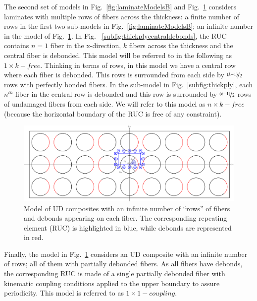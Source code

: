 \documentclass[review]{elsarticle}
\begin{document}
The second set of models in Fig.~\ref{fig:laminateModelsB} and Fig.~\ref{fig:thickplyalldebonds} considers laminates with multiple rows of fibers across the thickness: a finite number of rows in the first two sub-models in Fig.~\ref{fig:laminateModelsB}; an infinite number in the model of Fig.~\ref{fig:thickplyalldebonds}. In Fig. ~\ref{subfig:thickplycentraldebonds}, the RUC contains $n=1$ fiber in the x-direction, $k$ fibers across the thickness and the central fiber is debonded. This model will be referred to in the following as $1\times k-free$. Thinking in terms of rows, in this model we have a central row where each fiber is debonded. This rows is surrounded from each side by $\nicefrac{\left(k-1\right)}{2}$ rows with perfectly bonded fibers. In the sub-model in Fig.~\ref{subfig:thickply}, each $n^{th}$ fiber in the central row is debonded and this row is surrounded by $\nicefrac{\left(k-1\right)}{2}$ rows of undamaged fibers from each side. We will refer to this model as $n\times k-free$ (because the horizontal boundary of the RUC is free of any constraint).

\begin{figure}[!h]
\centering
\includegraphics[width=\textwidth]{thickPlyAllDebonds.pdf}
\caption{Model of UD composites with an infinite number of  ``rows'' of fibers and debonds appearing on each fiber. The corresponding repeating element (RUC) is highlighted in blue, while debonds are represented in red.}\label{fig:thickplyalldebonds}
\end{figure}

Finally, the model in Fig.~\ref{fig:thickplyalldebonds} considers an UD composite with an infinite number of rows; all of them with partially debonded fibers. As all fibers have debonds, the corresponding RUC is made of a single partially debonded fiber with kinematic coupling conditions applied to the upper boundary to assure periodicity. This model is referred to as $1\times 1-coupling$.
\end{document}
